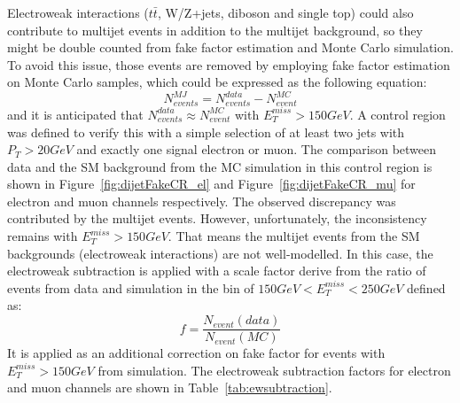 Electroweak interactions ($t\bar{t}$, W/Z+jets, diboson and single top) could also contribute to multijet events in addition to the multijet background, so they might be double counted from fake factor estimation and Monte Carlo simulation. To avoid this issue, those events are removed by employing fake factor estimation on Monte Carlo samples, which could be expressed as the following equation:
\begin{equation}
 N^{MJ}_{events} = N^{data}_{events}-N^{MC}_{event}
\end{equation}
and it is anticipated that $N^{data}_{events}\approx N^{MC}_{event}$ with $E^{miss}_{T}>150GeV$. A control region was defined to verify this with a simple selection of at least two jets with $P_{T}>20GeV$ and exactly one signal electron or muon. The comparison between data and the SM background from the MC simulation in this control region is shown in Figure~\ref{fig:dijetFakeCR_el} and Figure~\ref{fig:dijetFakeCR_mu} for electron and muon channels respectively. The observed discrepancy was contributed by the multijet events. However, unfortunately, the inconsistency remains with $E_{T}^{miss}>150 GeV$. That means the multijet events from the SM backgrounds (electroweak interactions) are not well-modelled. In this case, the electroweak subtraction is applied with a scale factor derive from the ratio of events from data and simulation in the bin of $150 GeV<E^{miss}_{T}<250GeV$ defined as: 
\begin{equation}
f = \frac{N_{event}(data)}{N_{event}(MC)}
\end{equation}
It is applied as an additional correction on fake factor for events with $E_{T}^{miss}>150 GeV$ from simulation. The electroweak subtraction factors for electron and muon channels are shown in Table~\ref{tab:ewsubtraction}.

